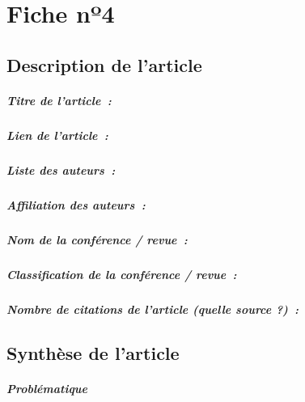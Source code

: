 
\chapter{Fiche nº4} %
\label{app:Fiche4} %

\section{Description de l'article}

\paragraph{Titre de l'article~:}
\paragraph{Lien de l'article~:}
\paragraph{Liste des auteurs~:}
\paragraph{Affiliation des auteurs~:}
\paragraph{Nom de la conférence / revue~:}
\paragraph{Classification de la conférence / revue~:}
\paragraph{Nombre de citations de l'article (quelle source ?)~:}



\section{Synthèse de l'article}

\paragraph{Problématique}
\lipsum[1]

